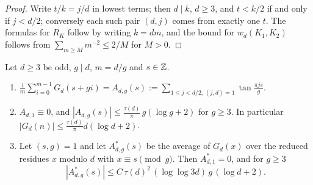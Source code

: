 \begin{proof}
Write $t/k=j/d$ in lowest terms; then $d\mid k$, $d\ge 3$, and $t<k/2$ if and only if $j<d/2$; conversely each such pair $(d,j)$ comes from exactly one $t$. The formulas for $R_K$ follow by writing $k=dm$, and the bound for $w_d(K_1,K_2)$ follows from $\sum_{m\ge M}m^{-2}\le 2/M$ for $M>0$.
\end{proof}

\begin{lemma}\label{lem:conditional-averages}
Let $d\ge 3$ be odd, $g\mid d$, $m=d/g$ and $s\in\mathbb{Z}$.
\begin{enumerate}[label=\textup{(\alph*)},leftmargin=*]
\item $\frac1m\sum_{i=0}^{m-1}G_d(s+gi)=A_{d,g}(s):=\sum_{1\le j<d/2,\,(j,d)=1}\tan\frac{\pi js}{g}$.
\item $A_{d,1}\equiv 0$, and $|A_{d,g}(s)|\le\frac{\tau(d)}{\pi}\,g(\log g+2)$ for $g\ge 3$. In particular $|G_d(n)|\le\frac{\tau(d)}{\pi}d(\log d+2)$.
\item Let $(s,g)=1$ and let $A^*_{d,g}(s)$ be the average of $G_d(x)$ over the reduced residues $x$ modulo $d$ with $x\equiv s\pmod g$. Then $A^*_{d,1}=0$, and for $g\ge 3$
\[
|A^*_{d,g}(s)|\le C\,\tau(d)^2\,(\log\log 3d)\,g\,(\log d+2).
\]
\end{enumerate}
\end{lemma}

